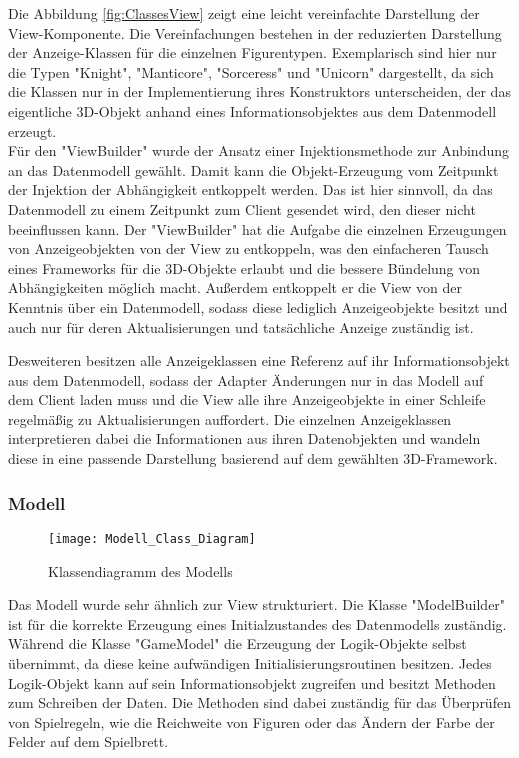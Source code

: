 \noindent Die Abbildung \ref{fig:ClassesView} zeigt eine leicht vereinfachte Darstellung der View-Komponente. Die Vereinfachungen bestehen in der reduzierten Darstellung der Anzeige-Klassen für die einzelnen Figurentypen. Exemplarisch sind hier nur die Typen "Knight", "Manticore", "Sorceress" und "Unicorn" dargestellt, da sich die Klassen nur in der Implementierung ihres Konstruktors unterscheiden, der das eigentliche 3D-Objekt anhand eines Informationsobjektes aus dem Datenmodell erzeugt.\\
Für den "ViewBuilder" wurde der Ansatz einer Injektionsmethode zur Anbindung an das Datenmodell gewählt. Damit kann die Objekt-Erzeugung vom Zeitpunkt der Injektion der Abhängigkeit entkoppelt werden. Das ist hier sinnvoll, da das Datenmodell zu einem Zeitpunkt zum Client gesendet wird, den dieser nicht beeinflussen kann. Der "ViewBuilder" hat die Aufgabe die einzelnen Erzeugungen von Anzeigeobjekten von der View zu entkoppeln, was den einfacheren Tausch eines Frameworks für die 3D-Objekte erlaubt und die bessere Bündelung von Abhängigkeiten möglich macht. Außerdem entkoppelt er die View von der Kenntnis über ein Datenmodell, sodass diese lediglich Anzeigeobjekte besitzt und auch nur für deren Aktualisierungen und tatsächliche Anzeige zuständig ist.

\noindent Desweiteren besitzen alle Anzeigeklassen eine Referenz auf ihr Informationsobjekt aus dem Datenmodell, sodass der Adapter Änderungen nur in das Modell auf dem Client laden muss und die View alle ihre Anzeigeobjekte in einer Schleife regelmäßig zu Aktualisierungen auffordert. Die einzelnen Anzeigeklassen interpretieren dabei die Informationen aus ihren Datenobjekten und wandeln diese in eine passende Darstellung basierend auf dem gewählten 3D-Framework.\\

\subsubsection{Modell}
\begin{figure}[htp]
	\centering
	\captionsetup{justification=centering}
	\texttt{[image: Modell\_Class\_Diagram]}
	\caption[Modell]{Klassendiagramm des Modells}
	\label{fig:ClassesModell}
\end{figure}

\noindent Das Modell wurde sehr ähnlich zur View strukturiert. Die Klasse "ModelBuilder" ist für die korrekte Erzeugung eines Initialzustandes des Datenmodells zuständig. Während die Klasse "GameModel" die Erzeugung der Logik-Objekte selbst übernimmt, da diese keine aufwändigen Initialisierungsroutinen besitzen. Jedes Logik-Objekt kann auf sein Informationsobjekt zugreifen und besitzt Methoden zum Schreiben der Daten. Die Methoden sind dabei zuständig für das Überprüfen von Spielregeln, wie die Reichweite von Figuren oder das Ändern der Farbe der Felder auf dem Spielbrett.

